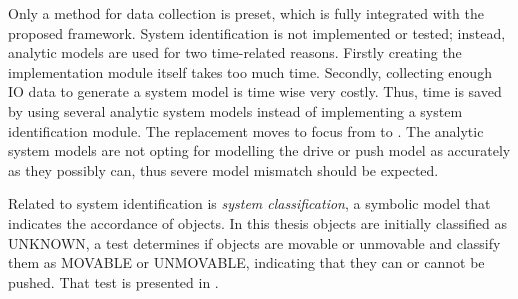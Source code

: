 Only a method for data collection is preset, which is fully integrated with the proposed framework. System identification is not implemented or tested; instead, analytic models are used for two time-related reasons. Firstly creating the implementation module itself takes too much time. Secondly, collecting enough \ac{IO} data to generate a system model is time wise very costly. Thus, time is saved by using several analytic system models instead of implementing a system identification module. The replacement moves to focus from  to . The analytic system models are not opting for modelling the drive or push model as accurately as they possibly can, thus severe model mismatch should be expected.\bs

Related to system identification is \textit{system classification}, a symbolic model that indicates the accordance of objects. In this thesis objects are initially classified as UNKNOWN, a test determines if objects are movable or unmovable and classify them as MOVABLE or UNMOVABLE, indicating that they can or cannot be pushed. That test is presented in .\bs
